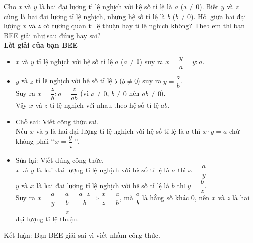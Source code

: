 \begin{vd}%
Cho $x$ và $y$ là hai đại lượng tỉ lệ nghịch với hệ số tỉ lệ là $a$ ($a\neq 0$). Biết $y$ và $z$ cũng là hai đại lượng tỉ lệ nghịch, nhưng hệ số tỉ lệ là $b$ ($b\neq 0$). Hỏi giữa hai đại lượng $x$ và $z$ có tương quan tỉ lệ thuận hay tỉ lệ nghịch không? Theo em thì bạn BEE giải như sau đúng hay sai?\\
{\bf{Lời giải của bạn BEE}}
\begin{itemize} 
	\item $x$ và $y$ tỉ lệ nghịch với hệ số tỉ lệ $a$ ($a\neq 0$) suy ra  $x = \dfrac{y}{a}= y\colon a$.
	\item $y$ và $z$ tỉ lệ nghịch với hệ số tỉ lệ $b$ ($b\neq 0$) suy ra $y = \dfrac{z}{b}$.\\
	Suy ra	$x = \dfrac{z}{b}\colon a = \dfrac{z}{ab}$ (vì $a\neq 0$, $b\neq 0$ nên $ab\neq 0$).\\
	Vậy $x$ và $z$ tỉ lệ nghịch với nhau theo hệ số tỉ lệ $ab$.
\end{itemize}
	\loigiai
	{\begin{itemize}
			\item Chỗ sai: Viết công thức sai.\\
			Nếu $x$ và $y$ là hai đại lượng tỉ lệ nghịch với hệ số tỉ lệ là $a$ thì $x\cdot y = a$ chứ không phải \lq\lq $x = \dfrac{y}{a}$ \rq\rq.
			\item Sửa lại: Viết đúng công thức.\\
			$x$  và $y$ là hai đại lượng tỉ lệ nghịch với hệ số tỉ lệ là $a$ thì $x = \dfrac{a}{y}$.\\
			$y$ và $x$ là hai đại lượng tỉ lệ nghịch với hệ số tỉ lệ là $b$ thì $y = \dfrac{b}{z}$.\\
			Suy ra $x = \dfrac{a}{y} =  \dfrac{a}{\dfrac{b}{z}} =  \dfrac{a\cdot z}{b}\Rightarrow \dfrac{x}{z} = \dfrac{a}{b}$, mà $\dfrac{a}{b}$ là hằng số khác $0$, nên $x$ và $z$ là hai đại lượng tỉ lệ thuận.
		\end{itemize}
	Kết luận: Bạn BEE giải sai vì viết nhầm công thức.
	}
\end{vd}

